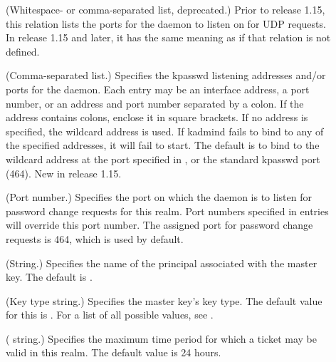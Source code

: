 \documentclass[letterpaper,10pt,english]{sphinxmanual}
\begin{document}
\begin{description}
\item[{}] \leavevmode
(Whitespace- or comma-separated list, deprecated.)  Prior to
release 1.15, this relation lists the ports for the
{\hyperref[\detokenize{admin/admin_commands/krb5kdc:krb5kdc-8}]{}} daemon to listen on for UDP requests.  In
release 1.15 and later, it has the same meaning as
 if that relation is not defined.

\item[{}] \leavevmode
(Comma-separated list.)  Specifies the kpasswd listening addresses
and/or ports for the {\hyperref[\detokenize{admin/admin_commands/kadmind:kadmind-8}]{}} daemon.  Each entry may be
an interface address, a port number, or an address and port number
separated by a colon.  If the address contains colons, enclose it
in square brackets.  If no address is specified, the wildcard
address is used.  If kadmind fails to bind to any of the specified
addresses, it will fail to start.  The default is to bind to the
wildcard address at the port specified in , or the
standard kpasswd port (464).  New in release 1.15.

\item[{}] \leavevmode
(Port number.)  Specifies the port on which the {\hyperref[\detokenize{admin/admin_commands/kadmind:kadmind-8}]{}}
daemon is to listen for password change requests for this realm.
Port numbers specified in  entries will override
this port number.  The assigned port for password change requests
is 464, which is used by default.

\item[{}] \leavevmode
(String.)  Specifies the name of the principal associated with the
master key.  The default is .

\item[{}] \leavevmode
(Key type string.)  Specifies the master key’s key type.  The
default value for this is .  For a list of all possible
values, see {\hyperref[\detokenize{admin/conf_files/kdc_conf:encryption-types}]{}}.

\item[{}] \leavevmode
( string.)  Specifies the maximum time period for
which a ticket may be valid in this realm.  The default value is
24 hours.


\end{description}
\end{document}
